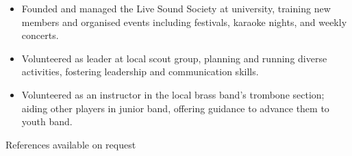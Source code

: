 \documentclass{my_cv}
\begin{document}
\begin{multicols}{2}
\begin{itemize}[noitemsep]
    \item Founded and managed the Live Sound Society at university, training new members and organised events including festivals, karaoke nights, and weekly concerts.
    \item Volunteered as leader at local scout group, planning and running diverse activities, fostering leadership and communication skills.
    \item Volunteered as an instructor in the local brass band's trombone section; aiding other players in junior band, offering guidance to advance them to youth band.
\end{itemize}

\end{multicols}

\begin{center}
References available on request
\end{center}
\end{document}

